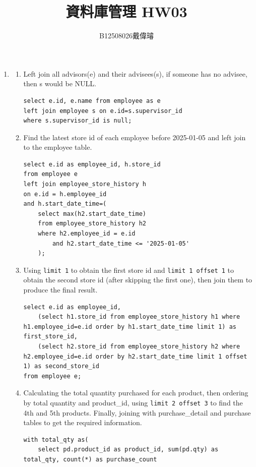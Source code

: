 \documentclass[12pt,a4paper]{article}
\title{資料庫管理 HW03}
\author{B12508026戴偉璿}
\date{}
\begin{document}
\maketitle


\begin{enumerate}
    \item 
    \begin{enumerate}
        \item Left join all advisors(e) and their advisees(s), if someone has no advisee, then s would be NULL.
        \begin{verbatim}
select e.id, e.name from employee as e
left join employee s on e.id=s.supervisor_id
where s.supervisor_id is null;
        \end{verbatim}
        \item Find the latest store id of each employee before 2025-01-05 and left join to the employee table.
        \begin{verbatim}
select e.id as employee_id, h.store_id
from employee e
left join employee_store_history h
on e.id = h.employee_id
and h.start_date_time=(
    select max(h2.start_date_time)
    from employee_store_history h2
    where h2.employee_id = e.id
        and h2.start_date_time <= '2025-01-05'
    );           
        \end{verbatim}
        \item Using \texttt{limit 1} to obtain the first store id and \texttt{limit 1 offset 1} to obtain the second store id (after skipping the first one), then join them to produce the final result.
        \begin{verbatim}
select e.id as employee_id,
    (select h1.store_id from employee_store_history h1 where h1.employee_id=e.id order by h1.start_date_time limit 1) as first_store_id,
    (select h2.store_id from employee_store_history h2 where h2.employee_id=e.id order by h2.start_date_time limit 1 offset 1) as second_store_id
from employee e;
        \end{verbatim}
        \item Calculating the total quantity purchased for each product, then ordering by total quantity and product\_id, using \texttt{limit 2 offset 3} to find the 4th and 5th products. Finally, joining with purchase\_detail and purchase tables to get the required information.
        \begin{verbatim}
with total_qty as(
    select pd.product_id as product_id, sum(pd.qty) as total_qty, count(*) as purchase_count

\end{verbatim}
\end{enumerate}
\end{enumerate}
\end{document}
